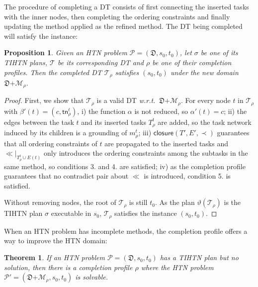 \documentclass[letterpaper]{article} %
\newtheorem{theorem}{Theorem}
\newtheorem{proposition}{Proposition}
\newcommand{\HtnDomain}{\mathfrak{D}}
\newcommand{\Methods}{\mathcal{M}}
\newcommand{\HtnProblem}{\mathcal{P}}
\renewcommand{\P}{\mathcal{P}}
\newcommand{\tn}{\mathsf{tn}}
\newcommand{\plan}{\sigma}
\newcommand{\Dtree}{\mathcal{T}}
\newcommand{\yield}{\vartheta}
\newcommand{\aspplus}{\textsf{+}}
\newcommand{\aspprec}{\ll}
\newcommand{\improveFunction}{\rho}
\newcommand{\closure}{\mathsf{closure}}
\begin{document}
The procedure of completing a DT consists of first connecting the inserted tasks with the inner nodes, then completing the ordering constraints and finally updating the method applied as the refined method.
The DT being completed will satisfy the instance: %

\begin{proposition}\label{prop:complete_tree}
Given an HTN problem $\HtnProblem {=} (\HtnDomain,s_0,t_0)$, let $\plan$ be one of its TIHTN plans, $\Dtree$ be its corresponding DT and $\improveFunction$ be one of their completion profiles. Then the completed DT $\Dtree_{\improveFunction}$ satisfies $(s_0,t_0)$ under the new domain $\HtnDomain \aspplus \Methods_{\improveFunction}$.
\end{proposition}


\begin{proof}
First, we show that $\Dtree_{\improveFunction}$ is a valid DT \emph{w.r.t.}\ $\HtnDomain \aspplus \Methods_{\improveFunction}$.
For every node $t$ in $\Dtree_\improveFunction$ with $\beta'(t)\!=\!(c,\tn_\improveFunction^t)$, i) the function $\alpha$ is not reduced, so $\alpha'(t)\!=\!c$; ii) the edges between the task $t$ and its inserted tasks $T_\improveFunction^t$ are added, so the task network induced by its children is a grounding of $m_\improveFunction^t$; iii) $\closure(T',E',\prec)$ guarantees that all ordering constraints of $t$ are propagated to the inserted tasks and ${\aspprec}|_{T^t_\improveFunction \cup E(t)}$ only introduces the ordering constraints among the subtasks in the same method, so conditions 3. and 4. are satisfied;
iv) as the completion profile guarantees that no contradict pair about $\aspprec$ is introduced, condition 5. is satisfied.

Without removing nodes, the root of $\Dtree_{\improveFunction}$ is still $t_0$.
As the plan $\yield(\Dtree_{\improveFunction})$ is the TIHTN plan $\plan$ executable in $s_0$, $\Dtree_{\improveFunction}$ satisfies the instance $(s_0,t_0)$.
\end{proof}


When an HTN problem has incomplete methods, the completion profile offers a way to improve the HTN domain: %

\begin{theorem}\label{thm:repair_htn}
If an HTN problem $\P{=}(\HtnDomain,s_0,t_0)$
has a TIHTN plan but no solution, then there is a completion profile $\improveFunction$ where the HTN problem $\P'=(\HtnDomain \aspplus \Methods_\improveFunction,s_0,t_0)$ is solvable.
\end{theorem}
\end{document}
